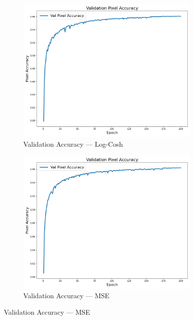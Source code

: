 \begin{figure}[p]
    \centering
    \begin{subfigure}[b]{0.48\textwidth}
        \includegraphics[width=\textwidth]{img/vae_results/200_epochs_128_ls_logcosh/logcosh_val_accuracy.png}
        \caption{Validation Accuracy — Log-Cosh}
    \end{subfigure}
    \hfill
    \begin{subfigure}[b]{0.48\textwidth}
        \includegraphics[width=\textwidth]{img/vae_results/200_epochs_128_ls_mse/mse_val_accuracy.png}
        \caption{Validation Accuracy — MSE}
    \end{subfigure}


\end{figure}
